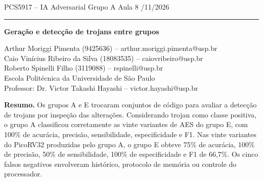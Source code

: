 \documentclass[10pt,a4paper]{article}
\begin{document}
\noindent\small PCS5917 -- IA Adversarial \hfill Grupo A \quad Aula 8 /11/2026
\par\noindent\rule{\textwidth}{0.4pt}
\begin{flushleft}
{\LARGE\bfseries Geração e detecção de trojans entre grupos}\par\medskip
Arthur Moriggi Pimenta (9425636) -- arthur.moriggi.pimenta@usp.br\\
Caio Vinícius Ribeiro da Silva (18083535) -- caiovribeiro@usp.br\\
Roberto Spinelli Filho (3119088) -- rspinelli@usp.br\\
Escola Politécnica da Universidade de São Paulo\\
Professor: Dr. Victor Takashi Hayashi -- victor.hayashi@usp.br
\end{flushleft}
\normalsize
\noindent\textbf{Resumo.} Os grupos A e E trocaram conjuntos de código para avaliar a detecção de trojans por inspeção das alterações. Considerando trojan como classe positiva, o grupo A classificou corretamente as vinte variantes de AES do grupo E, com 100\% de acurácia, precisão, sensibilidade, especificidade e F1. Nas vinte variantes do PicoRV32 produzidas pelo grupo A, o grupo E obteve 75\% de acurácia, 100\% de precisão, 50\% de sensibilidade, 100\% de especificidade e F1 de 66,7\%. Os cinco falsos negativos envolveram histórico, protocolo de memória ou controle do processador.
\end{document}
